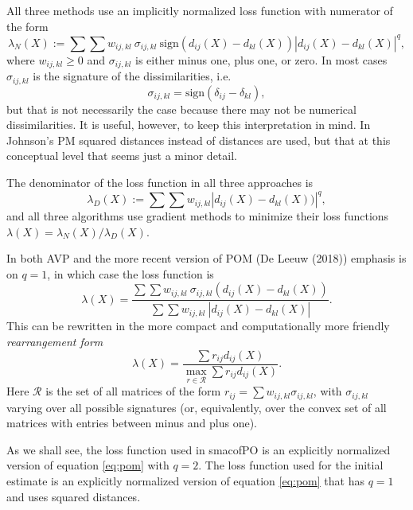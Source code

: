 \documentclass[
  12pt,
]{article}
\begin{document}
All three methods use an implicitly normalized loss function with numerator
of the form
\begin{equation}
\lambda_N(X):=\sum\sum w_{ij,kl}\ \sigma_{ij,kl}\ \text{sign}(d_{ij}(X)-d_{kl}(X))|d_{ij}(X)-d_{kl}(X)|^q,
\label{eq:pom}
\end{equation}
where \(w_{ij,kl}\geq 0\) and \(\sigma_{ij,kl}\) is either minus one, plus one, or
zero. In most cases \(\sigma_{ij,kl}\) is the signature of the dissimilarities, i.e.
\begin{equation}
\sigma_{ij,kl}=\text{sign}(\delta_{ij}-\delta_{kl}),
\label{eq:sijkl}
\end{equation}
but that is not necessarily the case because there may not be numerical dissimilarities. It is useful, however, to keep this interpretation in mind. In Johnson's PM squared distances instead of distances are used, but that at this conceptual level that seems just a minor detail.

The denominator of the loss function in all three approaches is
\begin{equation}
\lambda_D(X):=\sum\sum w_{ij,kl}|d_{ij}(X)-d_{kl}(X))|^q,
\label{eq:lambdad}
\end{equation}
and all three algorithms use gradient methods to minimize their loss functions
\(\lambda(X)=\lambda_N(X)/\lambda_D(X)\).

In both AVP and the more recent version of POM (De Leeuw (2018)) emphasis is on
\(q=1\), in which case the loss function is
\begin{equation}
\lambda(X)=\frac{\sum\sum w_{ij,kl}\ \sigma_{ij,kl}(d_{ij}(X)-d_{kl}(X))}{\sum\sum w_{ij,kl}\ |d_{ij}(X)-d_{kl}(X)|}.
\label{eq:lambda1}
\end{equation}
This can be rewritten in the more compact and computationally more friendly \emph{rearrangement form}
\begin{equation}
\lambda(X)=\frac{\sum r_{ij}d_{ij}(X)}{\max_{r\in\mathcal{R}}\sum r_{ij}d_{ij}(X)}.
\label{eq:rearrange}
\end{equation}
Here \(\mathcal{R}\) is the set of all matrices of the form \(r_{ij}=\sum w_{ij,kl}\sigma_{ij,kl}\), with \(\sigma_{ij,kl}\) varying over all possible
signatures (or, equivalently, over the convex set of all matrices with entries between minus and plus one).

As we shall see, the loss function used in smacofPO is an explicitly normalized version of equation \eqref{eq:pom} with \(q=2\). The loss function used for the initial estimate is an explicitly normalized version of equation \eqref{eq:pom} that has \(q=1\) and uses squared distances.
\end{document}
